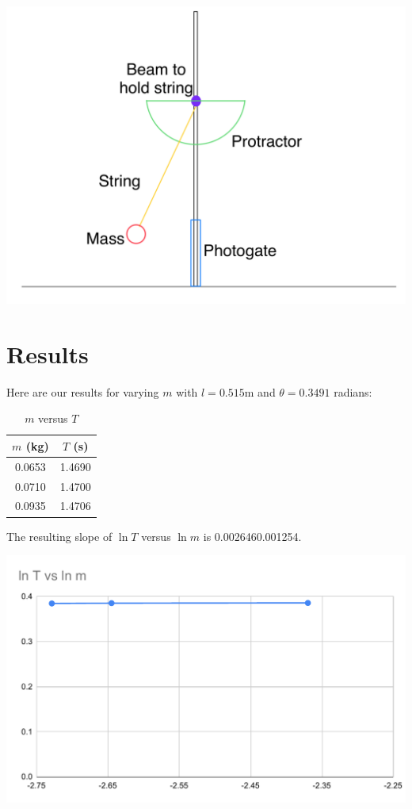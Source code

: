 \documentclass[12pt]{article}
\begin{document}
\begin{center}
\includegraphics[width=6.5in]{./setup.png}
\end{center}
\section{Results}
\label{sec:orge50f4b8}

Here are our results for varying \(m\) with \(l = 0.515\)m and \(\theta = 0.3491\) radians:

\begin{table}[htbp]
\caption{\(m\) versus \(T\)}
\centering
\begin{tabular}{c|c}
\(m\) (kg) & \(T\) (s)\\
\hline
0.0653 & 1.4690\\
0.0710 & 1.4700\\
0.0935 & 1.4706\\
\end{tabular}
\end{table}

The resulting slope of \(\ln T\) versus \(\ln m\) is 0.002646\textpm{}0.001254.

\begin{center}
\includegraphics[width=6.5in]{./tvm.pdf}
\end{center}
\end{document}
